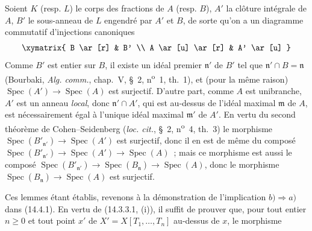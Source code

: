 Soient $K$ (resp. $L$) le corps des fractions de $A$ (resp. $B$), $A'$ la clôture
intégrale de $A$, $B'$ le sous-anneau de $L$ engendré par $A'$ et $B$, de sorte
qu'on a un diagramme commutatif d'injections canoniques
\[
  \xymatrix{
    B \ar[r] & B' \\
    A \ar[u] \ar[r] & A' \ar[u]
  }
\]
Comme $B'$ est entier sur $B$, il existe un idéal premier $\mathfrak n'$ de $B'$
tel que $\mathfrak n'\cap B=\mathfrak n$ (Bourbaki, \emph{Alg. comm.}, chap.~V,
\S~2, n\textsuperscript{o}~1, th.~1), et (pour la même raison)
$\operatorname{Spec}(A')\to\operatorname{Spec}(A)$ est surjectif. D'autre part,
comme $A$ est unibranche, $A'$ est un anneau \emph{local}, donc
$\mathfrak n'\cap A'$, qui est au-dessus de l'idéal maximal $\mathfrak m$ de $A$,
est nécessairement égal à l'unique idéal maximal $\mathfrak m'$ de $A'$. En vertu
du second théorème de Cohen--Seidenberg (\emph{loc. cit.}, \S~2,
n\textsuperscript{o}~4, th.~3) le morphisme
$\operatorname{Spec}(B'_{\mathfrak n'})\to\operatorname{Spec}(A')$ est surjectif,
donc il en est de même du composé
$\operatorname{Spec}(B'_{\mathfrak n'})\to\operatorname{Spec}(A')\to
\operatorname{Spec}(A)$~; mais ce morphisme est aussi le composé
$\operatorname{Spec}(B'_{\mathfrak n'})\to\operatorname{Spec}(B_{\mathfrak n})
\to\operatorname{Spec}(A)$, donc le morphisme
$\operatorname{Spec}(B_{\mathfrak n})\to\operatorname{Spec}(A)$ est surjectif.

Ces lemmes étant établis, revenons à la démonstration de l'implication $b)\Rightarrow
a)$ dans (14.4.1). En vertu de (14.3.3.1, (i)), il suffit de prouver que, pour tout
entier $n\geq 0$ et tout point $x'$ de $X'=X[T_1,\ldots,T_n]$ au-dessus de $x$, le
morphisme

